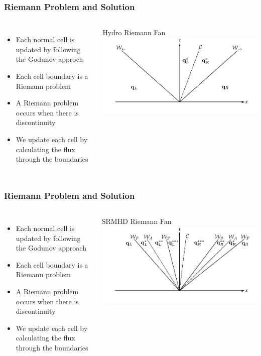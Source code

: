 \documentclass{beamer}
\begin{document}
\begin{frame}
\frametitle{Riemann Problem and Solution}
\begin{columns}
\begin{itemize}
\item{Each normal cell is updated by following the Godunov approch}
\item{Each cell boundary is a Riemann problem}
\item{A Riemann problem occurs when there is discontinuity}
\item{We update each cell by calculating the flux through the boundaries}
\end{itemize}
\centering
Hydro Riemann Fan
\includegraphics[width=\textwidth]{../images/euler_wave.pdf}
\end{columns}
\end{frame}

\begin{frame}
\frametitle{Riemann Problem and Solution}
\begin{columns}
\begin{itemize}
\item{Each normal cell is updated by following the Godunov approach}
\item{Each cell boundary is a Riemann problem}
\item{A Riemann problem occurs when there is discontinuity}
\item{We update each cell by calculating the flux through the boundaries}
\end{itemize}
\centering
SRMHD Riemann Fan
\includegraphics[width=\textwidth]{../images/srmhd_wave.pdf}
\end{columns}
\end{frame}
\end{document}

